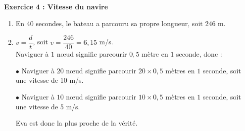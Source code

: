 \textbf{Exercice 4 : Vitesse du navire}

\medskip

\begin{enumerate}
\item En 40 secondes, le bateau a parcouru sa propre longueur, soit 246 m. 
\item $v=\dfrac{d}{t}$, soit $v=\dfrac{246}{40}=6,15$ m/s. \\[2mm]
Naviguer à  $1$ nœud signifie parcourir $0,5$ mètre en $1$ seconde, donc :

\quad $\bullet$ Naviguer à  $20$ nœud signifie parcourir $20\times0,5$ mètres en $1$ seconde, soit une vitesse de 10 m/s.

\quad $\bullet$ Naviguer à  $10$ nœud signifie parcourir $10\times0,5$ mètres en $1$ seconde, soit une vitesse de 5 m/s.

 Eva est donc la plus proche de la vérité. 
\end{enumerate}


\vspace{0,5cm}

